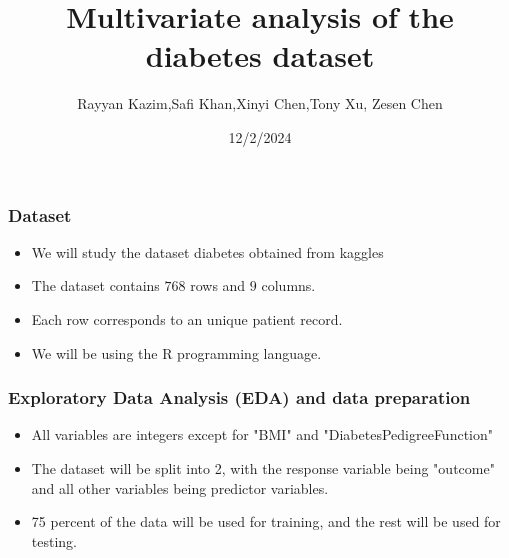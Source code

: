 \documentclass{beamer}
\title{Multivariate analysis of the diabetes dataset}
\author{Rayyan Kazim,Safi Khan,Xinyi Chen,Tony Xu, Zesen Chen}
\institute{McMaster University}
\date{12/2/2024}
\begin{document}
\frame{\titlepage}

\begin{frame}
\frametitle{Dataset}
\begin{itemize}
    \setlength\itemsep{3em}
    \item We will study the dataset diabetes obtained from kaggles 
    \item The dataset contains $768$ rows and $9$ columns.
    \item Each row corresponds to an unique patient record.
    \item We will be using the R programming language.
\end{itemize}
\end{frame}

\begin{frame}
    \frametitle{Exploratory Data Analysis (EDA) and data preparation}
    \begin{itemize}
        \setlength\itemsep{1em}
        \item All variables are integers except for "BMI" and "DiabetesPedigreeFunction"

        \item The dataset will be split into 2, with the response variable being "outcome" and all other variables being predictor variables.
        \item 75 percent of the data will be used for training, and the rest will be used for testing.
    \end{itemize}
\end{frame}
\end{document}
